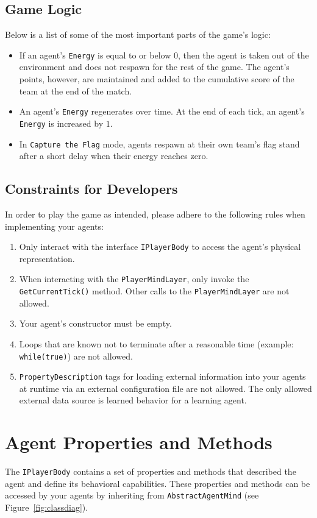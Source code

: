\documentclass[a4paper,english,DIV=16,11pt,parskip=half,dvipsnames,listof=totoc,index=totoc,bibliography=totoc]{scrartcl}
\newcommand\todo[1]{\textcolor{red}{#1}}
\begin{document}
\subsection{Game Logic}
Below is a list of some of the most important parts of the game's logic:
%
\begin{itemize}
  \item If an agent's \texttt{Energy} is equal to or below 0, then the agent is taken out of the environment and does not respawn for the rest of the game. The agent's points, however, are maintained and added to the cumulative score of the team at the end of the match.
  \item An agent's \texttt{Energy} regenerates over time. At the end of each tick, an agent's \texttt{Energy} is increased by $1$.
  \item In \texttt{Capture the Flag} mode, agents respawn at their own team's flag stand after a short delay when their energy reaches zero.
\end{itemize}

%
\subsection{Constraints for Developers}
In order to play the game as intended, please adhere to the following rules when implementing your agents:
\begin{enumerate}
  \item Only interact with the interface \texttt{IPlayerBody} to access the agent's physical representation.
  \item When interacting with the \texttt{PlayerMindLayer}, only invoke the \texttt{GetCurrentTick()} method. Other calls to the \texttt{PlayerMindLayer} are not allowed.
  \item Your agent's constructor must be empty. %
  \item Loops that are known not to terminate after a reasonable time (example: \texttt{while(true)}) are not allowed.
  \item \texttt{PropertyDescription} tags for loading external information into your agents at runtime via an external configuration file are not allowed. The only allowed external data source is learned behavior for a learning agent.
\end{enumerate}
%
\section{Agent Properties and Methods} \label{sec:AgentDesc}
The \texttt{IPlayerBody} contains a set of properties and methods that described the agent and define its behavioral capabilities. These properties and methods can be accessed by your agents by inheriting from \texttt{AbstractAgentMind} (see Figure~\ref{fig:classdiag}).
%
\end{document}
